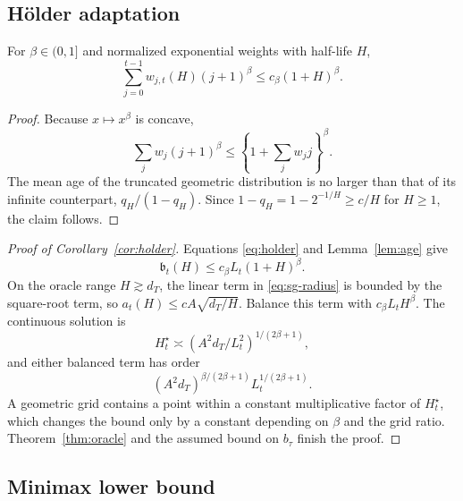 \subsection{H\"older adaptation}

\begin{lemma}
\label{lem:age}
For $\beta\in(0,1]$ and normalized exponential weights with half-life $H$,
\begin{equation}
 \sum_{j=0}^{t-1}w_{j,t}(H)(j+1)^\beta\le c_\beta(1+H)^\beta.
\end{equation}
\end{lemma}

\begin{proof}
Because $x\mapsto x^\beta$ is concave,
\begin{equation}
 \sum_jw_j(j+1)^\beta\le\left\{1+\sum_jw_jj\right\}^\beta.
\end{equation}
The mean age of the truncated geometric distribution is no larger than that of its infinite counterpart, $q_H/(1-q_H)$.  Since $1-q_H=1-2^{-1/H}\ge c/H$ for $H\ge1$, the claim follows.
\end{proof}

\begin{proof}[Proof of Corollary~\ref{cor:holder}]
Equations \eqref{eq:holder} and Lemma~\ref{lem:age} give
\begin{equation}
 \mathfrak b_t(H)\le c_\beta L_t(1+H)^\beta.
\end{equation}
On the oracle range $H\gtrsim d_T$, the linear term in \eqref{eq:sg-radius} is bounded by the square-root term, so
$a_t(H)\le cA\sqrt{d_T/H}$.  Balance this term with $c_\beta L_tH^\beta$.  The continuous solution is
\begin{equation}
 H_t^\star\asymp(A^2d_T/L_t^2)^{1/(2\beta+1)},
\end{equation}
and either balanced term has order
\begin{equation}
 (A^2d_T)^{\beta/(2\beta+1)}L_t^{1/(2\beta+1)}.
\end{equation}
A geometric grid contains a point within a constant multiplicative factor of $H_t^\star$, which changes the bound only by a constant depending on $\beta$ and the grid ratio.  Theorem~\ref{thm:oracle} and the assumed bound on $b_\tau$ finish the proof.
\end{proof}

\subsection{Minimax lower bound}

